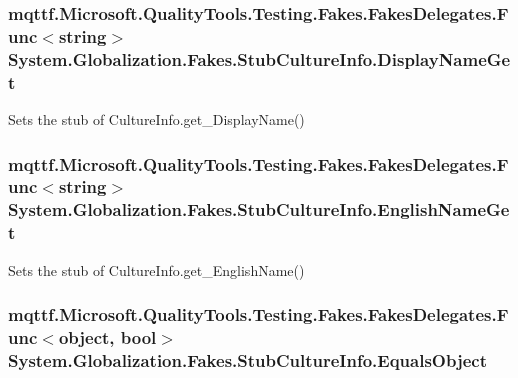 \hypertarget{class_system_1_1_globalization_1_1_fakes_1_1_stub_culture_info_aa9d92f3a96d638b2297b6e25c240a06e}{
\subsubsection[{Display\-Name\-Get}]{\setlength{\rightskip}{0pt plus 5cm}mqttf.\-Microsoft.\-Quality\-Tools.\-Testing.\-Fakes.\-Fakes\-Delegates.\-Func$<$string$>$ System.\-Globalization.\-Fakes.\-Stub\-Culture\-Info.\-Display\-Name\-Get}}\label{class_system_1_1_globalization_1_1_fakes_1_1_stub_culture_info_aa9d92f3a96d638b2297b6e25c240a06e}


Sets the stub of Culture\-Info.\-get\-\_\-\-Display\-Name()

\hypertarget{class_system_1_1_globalization_1_1_fakes_1_1_stub_culture_info_a3707915d0bf0201a284266bde13562cf}{
\subsubsection[{English\-Name\-Get}]{\setlength{\rightskip}{0pt plus 5cm}mqttf.\-Microsoft.\-Quality\-Tools.\-Testing.\-Fakes.\-Fakes\-Delegates.\-Func$<$string$>$ System.\-Globalization.\-Fakes.\-Stub\-Culture\-Info.\-English\-Name\-Get}}\label{class_system_1_1_globalization_1_1_fakes_1_1_stub_culture_info_a3707915d0bf0201a284266bde13562cf}


Sets the stub of Culture\-Info.\-get\-\_\-\-English\-Name()

\hypertarget{class_system_1_1_globalization_1_1_fakes_1_1_stub_culture_info_aa7af9e2f412d13a6eda018a61a46a2fa}{
\subsubsection[{Equals\-Object}]{\setlength{\rightskip}{0pt plus 5cm}mqttf.\-Microsoft.\-Quality\-Tools.\-Testing.\-Fakes.\-Fakes\-Delegates.\-Func$<$object, bool$>$ System.\-Globalization.\-Fakes.\-Stub\-Culture\-Info.\-Equals\-Object}}\label{class_system_1_1_globalization_1_1_fakes_1_1_stub_culture_info_aa7af9e2f412d13a6eda018a61a46a2fa}


